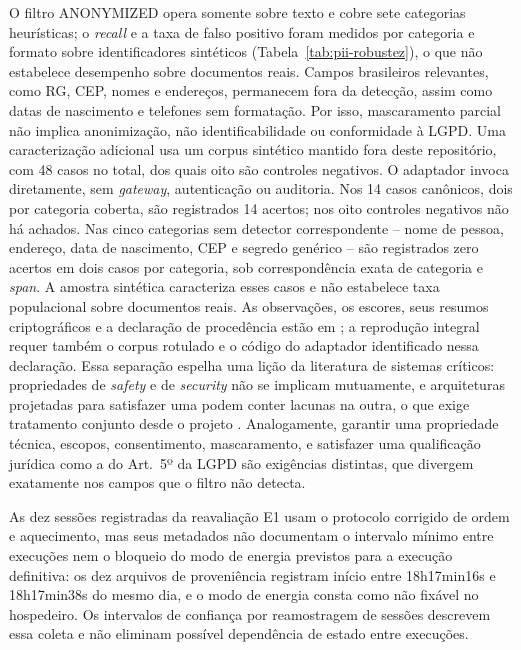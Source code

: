 \documentclass[12pt,openright,twoside,a4paper,english,brazil]{abntex2}
\begin{document}
O filtro ANONYMIZED opera somente sobre texto e cobre sete categorias heurísticas; o \textit{recall} e a taxa de falso positivo foram medidos por categoria e formato sobre identificadores sintéticos (Tabela~\ref{tab:pii-robustez}), o que não estabelece desempenho sobre documentos reais. Campos brasileiros relevantes, como RG, CEP, nomes e endereços, permanecem fora da detecção, assim como datas de nascimento e telefones sem formatação. Por isso, mascaramento parcial não implica anonimização, não identificabilidade ou conformidade à LGPD. Uma caracterização adicional usa um corpus sintético mantido fora deste repositório, com 48 casos no total, dos quais oito são controles negativos. O adaptador invoca  diretamente, sem \textit{gateway}, autenticação ou auditoria. Nos 14 casos canônicos, dois por categoria coberta, são registrados 14 acertos; nos oito controles negativos não há achados. Nas cinco categorias sem detector correspondente -- nome de pessoa, endereço, data de nascimento, CEP e segredo genérico -- são registrados zero acertos em dois casos por categoria, sob correspondência exata de categoria e \textit{span}. A amostra sintética caracteriza esses casos e não estabelece taxa populacional sobre documentos reais. As observações, os escores, seus resumos criptográficos e a declaração de procedência estão em ; a reprodução integral requer também o corpus rotulado e o código do adaptador identificado nessa declaração. Essa separação espelha uma lição da literatura de sistemas críticos: propriedades de \textit{safety} e de \textit{security} não se implicam mutuamente, e arquiteturas projetadas para satisfazer uma podem conter lacunas na outra, o que exige tratamento conjunto desde o projeto \cite{ferrao2022}. Analogamente, garantir uma propriedade técnica, escopos, consentimento, mascaramento, e satisfazer uma qualificação jurídica como a do Art.~5º da LGPD são exigências distintas, que divergem exatamente nos campos que o filtro não detecta.

As dez sessões registradas da reavaliação E1 usam o protocolo corrigido de ordem e aquecimento, mas seus metadados não documentam o intervalo mínimo entre execuções nem o bloqueio do modo de energia previstos para a execução definitiva: os dez arquivos de proveniência registram início entre 18h17min16s e 18h17min38s do mesmo dia, e o modo de energia consta como não fixável no hospedeiro. Os intervalos de confiança por reamostragem de sessões descrevem essa coleta e não eliminam possível dependência de estado entre execuções.
\end{document}
